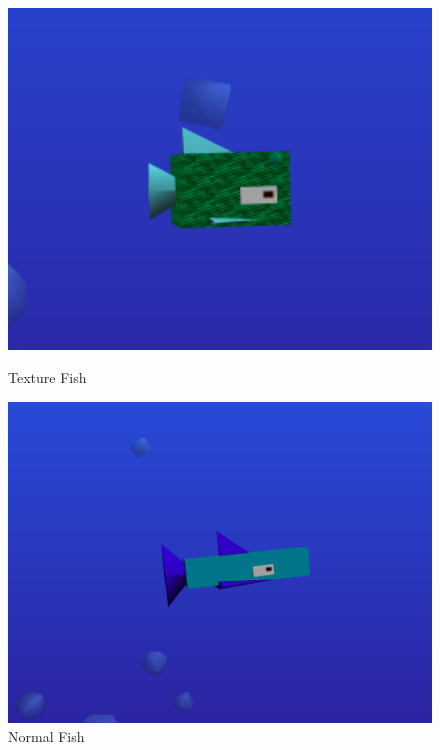 \documentclass[a4paper,10pt]{article}
\begin{document}
\begin{figure}[H]
    \centering
    \begin{minipage}{0.45\textwidth}
        \centering
        \includegraphics[width=1\textwidth]{Screenshot_20190226_201004.png} %
        \caption{Texture Fish}
    \end{minipage}\hfill
    \begin{minipage}{0.45\textwidth}
        \centering
        \includegraphics[width=1\textwidth]{Screenshot_20190226_201047.png} %
        \caption{Normal Fish}
    \end{minipage}
\end{figure}
\end{document}
